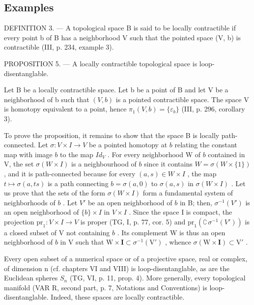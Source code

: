 \subsection{Examples}


DEFINITION 3. --- A topological space B is said to be locally contractible if every point b of B has a neighborhood V such that the pointed space (V, b) is contractible (III, p. 234, example 3).

PROPOSITION 5. --- A locally contractible topological space is loop-disentanglable.

Let B be a locally contractible space. Let b be a point of B and let V be a neighborhood of b such that \((V, b)\) is a pointed contractible space. The space V is homotopy equivalent to a point, hence \(\pi_{1}(V, b) = \{\varepsilon_{b}\}\) (III, p. 296, corollary 3).

To prove the proposition, it remains to show that the space B is locally path-connected. Let \(\sigma: V \times I \to V\) be a pointed homotopy at \(b\) relating the constant map with image \(b\) to the map \(Id_V\) . For every neighborhood W of \(b\) contained in V, the set \(\sigma(W \times I)\) is a neighbourhood of \(b\) since it contains \(W = \sigma(W \times \{1\})\) , and it is path-connected because for every \((a, s) \in W \times I\) , the map \(t \mapsto \sigma(a, ts)\) is a path connecting \(b = \sigma(a, 0)\) to \(\sigma(a, s)\) in \(\sigma(W \times I)\) . Let us prove that the sets of the form \(\sigma(W \times I)\) form a fundamental system of neighborhoods of \(b\) . Let \(V'\) be an open neighborhood of \(b\) in B; then, \(\sigma^{-1}(V')\) is an open neighborhood of \(\{b\} \times I\) in \(V \times I\) . Since the space I is compact, the projection \(\mathrm{pr}_1: V \times I \to V\) is proper (TG, I, p. 77, cor. 5) and \(\mathrm{pr}_1(\complement\,\sigma^{-1}(V'))\) is a closed subset of V not containing \(b\) . Its complement W is thus an open neighborhood of \(b\) in V such that \(\mathrm{W} \times \mathbf{I} \subset \sigma^{-1}(\mathrm{V}')\) , whence \(\sigma(\mathrm{W} \times \mathbf{I}) \subset \mathrm{V}'\) .

Every open subset of a numerical space or of a projective space, real or complex, of dimension n (cf. chapters VI and VIII) is loop-disentanglable, as are the Euclidean spheres \(S_{n}\) (TG, VI, p. 11, prop. 4). More generally, every topological manifold (VAR R, second part, p. 7, Notations and Conventions) is loop-disentanglable. Indeed, these spaces are locally contractible.

